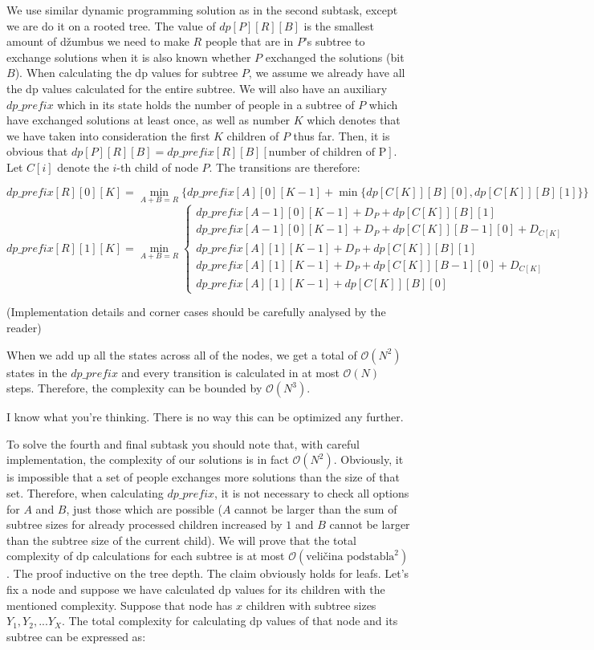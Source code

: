 \documentclass[a4paper]{article}
\begin{document}
We use similar dynamic programming solution as in the second subtask, except we
are do it on a rooted tree. The value of $dp[P][R][B]$ is the smallest amount of
džumbus we need to make $R$ people that are in $P$'s subtree to exchange
solutions when it is also known whether $P$ exchanged the solutions (bit $B$).
When calculating the dp values for subtree $P$, we assume we already have all
the dp values calculated for the entire subtree. We will also have an auxiliary
$dp\_prefix$ which in its state holds the number of people in a subtree of $P$
which have exchanged solutions at least once, as well as number $K$ which
denotes that we have taken into consideration the first $K$ children of $P$ thus
far. Then, it is obvious that $dp[P][R][B] = dp\_prefix[R][B][\text{number of children of P}]$.
Let $C[i]$ denote the $i$-th child of node $P$. The transitions are therefore:

$$
dp\_prefix[R][0][K] =
\min_{A + B = R} \{ dp\_prefix[A][0][K-1] + \min \{ dp[C[K]][B][0], dp[C[K]][B][1] \} \}
$$
$$
dp\_prefix[R][1][K] = \min_{A + B = R}
\begin{cases}
    dp\_prefix[A-1][0][K-1] + D_P + dp[C[K]][B][1] \\
    dp\_prefix[A-1][0][K-1] + D_P + dp[C[K]][B-1][0] + D_{C[K]} \\
    dp\_prefix[A][1][K-1] + D_P + dp[C[K]][B][1] \\
    dp\_prefix[A][1][K-1] + D_P + dp[C[K]][B-1][0] + D_{C[K]} \\
    dp\_prefix[A][1][K-1] + dp[C[K]][B][0]
\end{cases}
$$

(Implementation details and corner cases should be carefully analysed by the
reader)

When we add up all the states across all of the nodes, we get a total of
$\mathcal{O}(N^2)$ states in the $dp\_prefix$ and every transition is
calculated in at most $\mathcal{O}(N)$ steps. Therefore, the complexity
can be bounded by $\mathcal{O}(N^3)$.

I know what you're thinking. There is no way this can be optimized any further.

To solve the fourth and final subtask you should note that, with careful
implementation, the complexity of our solutions is in fact $\mathcal{O}(N^2)$.
Obviously, it is impossible that a set of people exchanges more solutions than
the size of that set. Therefore, when calculating $dp\_prefix$, it is not
necessary to check all options for $A$ and $B$, just those which are possible
($A$ cannot be larger than the sum of subtree sizes for already processed children
increased by $1$ and $B$ cannot be larger than the subtree size of the current child).
We will prove that the total complexity of dp calculations for each subtree is at
most $\mathcal{O}(\text{veličina podstabla}^2)$. The proof inductive on the tree
depth. The claim obviously holds for leafs. Let's fix a node and suppose we
have calculated dp values for its children with the mentioned complexity. Suppose
that node has $x$ children with subtree sizes $Y_1, Y_2, ... Y_X$. The total
complexity for calculating dp values of that node and its subtree can be 
expressed as:
\end{document}
